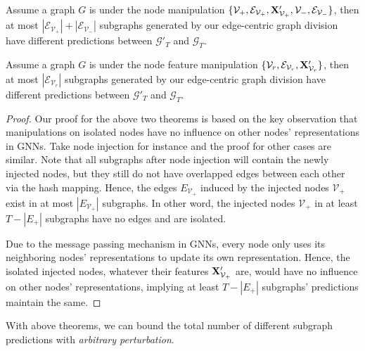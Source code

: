\begin{theorem}[]
\label{thm:nodeperturb} 
Assume a graph $G$ is under the node manipulation  
$\{\mathcal{V}_+, \mathcal{E}_{\mathcal{V}_+},{\bf X}'_{\mathcal{V}_+},\mathcal{V}_-, \mathcal{E}_{\mathcal{V}_-}\}$,
then at most $|\mathcal{E}_{\mathcal{V}_+}| + | \mathcal{E}_{\mathcal{V}_-}| $ subgraphs generated by our edge-centric graph division have different predictions between $\mathcal{G}'_T$ and $\mathcal{G}_T$. 
\end{theorem}


\begin{theorem}[]
\label{thm:nodefeaperturb} 
Assume a graph $G$ is under the node feature manipulation 
$\{\mathcal{V}_r, \mathcal{E}_{\mathcal{V}_r},{\bf X}'_{\mathcal{V}_r}\}$, 
then at most $|\mathcal{E}_{\mathcal{V}_r}|$ subgraphs generated by our edge-centric graph division have different predictions between $\mathcal{G}'_T$ and $\mathcal{G}_T$. 
\end{theorem}

\begin{proof}
Our proof for the above two theorems is based on the key observation that manipulations on isolated nodes have no influence on other nodes' representations in GNNs. 
Take node injection for instance and the proof for other cases are similar.  
Note that all subgraphs after node injection will contain the newly injected nodes, but they still do not have overlapped edges between each other via the hash mapping. Hence, the edges $E_{\mathcal{V}_+}$ induced by the injected nodes $\mathcal{V}_+$ exist in at most $|E_{\mathcal{V}_+}|$ subgraphs. In other word, the injected nodes $\mathcal{V}_+$ in at least $T-|E_{+}|$ subgraphs have no  edges and are isolated. 

Due to the message passing mechanism in GNNs, every node only uses its neighboring nodes' representations to update its own representation. Hence, 
the isolated injected nodes, whatever their features ${\bf X}'_{\mathcal{V}_+}$ are, would have no influence on other nodes' representations, implying at least $T-|E_{+}|$ subgraphs' predictions maintain the same. 
\vspace{-2mm}
\end{proof}


With above theorems, we can bound the total number of different subgraph predictions with \emph{arbitrary perturbation}.

